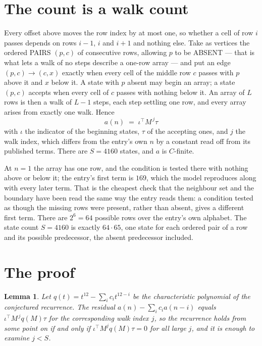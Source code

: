 \documentclass[11pt,a4paper]{article}
\theoremstyle{plain}
\newtheorem{lemma}[theorem]{Lemma}
\theoremstyle{definition}
\begin{document}
\section{The count is a walk count}

Every offset above moves the row index by at most one, so whether a cell of row $i$ passes
depends on rows $i-1$, $i$ and $i+1$ and nothing else. Take as vertices the ordered PAIRS
$(p,c)$ of consecutive rows, allowing $p$ to be ABSENT --- that is what lets a walk of no steps
describe a one-row array --- and put an edge $(p,c)\to(c,x)$ exactly when every cell of the
middle row $c$ passes with $p$ above it and $x$ below it. A state with $p$ absent may begin an
array; a state $(p,c)$ accepts when every cell of $c$ passes with nothing below it. An array of
$L$ rows is then a walk of $L-1$ steps, each step settling one row, and every array arises from
exactly one walk. Hence
\[
a(n)\;=\;\iota^{\!\top}M^{\,j}\tau
\]
with $\iota$ the indicator of the beginning states, $\tau$ of the accepting ones, and $j$ the
walk index, which differs from the entry's own $n$ by a constant read off from its published
terms. There are $S=4160$ states, and $a$ is $C$-finite.

At $n=1$ the array has one row, and
the condition is tested there with nothing above or below it; the entry's first term is
$169$, which the model reproduces along with every later term. That is the cheapest check
that the neighbour set and the boundary have been read the same way the entry reads them: a
condition tested as though the missing rows were present, rather than absent, gives a different
first term. There are $2^{6}=64$ possible rows over the entry's own alphabet. The state count $S=4160$ is exactly $64\cdot65$,
one state for each ordered pair of a row and its possible predecessor, the absent predecessor
included.

\section{The proof}

\begin{lemma}\label{lem:crit}
Let $q(t)=t^{12}-\sum_i c_it^{12-i}$ be the characteristic polynomial of the
conjectured recurrence. The residual $a(n)-\sum_ic_ia(n-i)$ equals
$\iota^{\!\top}M^{\,j}q(M)\tau$ for the corresponding walk index $j$, so the recurrence
holds from some point on if and only if $\iota^{\!\top}M^{j}q(M)\tau=0$ for all large $j$,
and it is enough to examine $j<S$.
\end{lemma}
\end{document}
